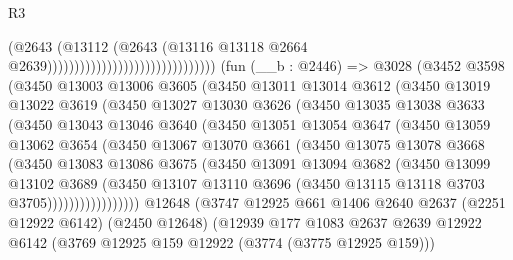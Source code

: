 \begin{lexlean}{R3}
\begin{coremodule}
                                                          (@2643
                                                            (@13112
                                                              (@2643
                                                                (@13116
                                                                  @13118
                                                                  @2664
                                                                  @2639)))))))))))))))))))))))))))))))
    (fun (__b : @2446) =>
    @3028
      (@3452
        @3598
        (@3450
          @13003
          @13006
          @3605
          (@3450
            @13011
            @13014
            @3612
            (@3450
              @13019
              @13022
              @3619
              (@3450
                @13027
                @13030
                @3626
                (@3450
                  @13035
                  @13038
                  @3633
                  (@3450
                    @13043
                    @13046
                    @3640
                    (@3450
                      @13051
                      @13054
                      @3647
                      (@3450
                        @13059
                        @13062
                        @3654
                        (@3450
                          @13067
                          @13070
                          @3661
                          (@3450
                            @13075
                            @13078
                            @3668
                            (@3450
                              @13083
                              @13086
                              @3675
                              (@3450
                                @13091
                                @13094
                                @3682
                                (@3450
                                  @13099
                                  @13102
                                  @3689
                                  (@3450
                                    @13107
                                    @13110
                                    @3696
                                    (@3450 @13115 @13118 @3703 @3705)))))))))))))))))
    @12648
    (@3747
      @12925
      @661
      @1406
      @2640
      @2637
      (@2251 @12922 @6142)
      (@2450 @12648)
      (@12939
        @177
        @1083
        @2637
        @2639
        @12922
        @6142
        (@3769 @12925 @159 @12922 (@3774 (@3775 @12925 @159)))

\end{coremodule}
\end{lexlean}
